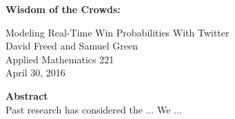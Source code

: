 \documentclass[12pt]{article}
\begin{document}
\renewcommand*{\thefootnote}{\fnsymbol{footnote}}


\begin{titlepage}
\begin{doublespacing}
    \begin{center}
        \vspace*{1cm}
        \Large
        \textbf{Wisdom of the Crowds:}
        
        \vspace{0.5cm}
        Modeling Real-Time Win Probabilities With Twitter\\
        \large
        \vspace{1cm}
        David Freed and Samuel Green\\ \vspace{0cm}
        Applied Mathematics 221 \\
        April 30, 2016 \\
       \end{center}
       
       \vspace{3cm}
       
	\begin{center}
	    \textbf{Abstract} \\
	    Past research has considered the ... We ... 
	\end{center}

\end{doublespacing}
\end{titlepage}

\renewcommand*{\thefootnote}{\arabic{footnote}}

\setcounter{page}{1}
\newpage
\end{document}
